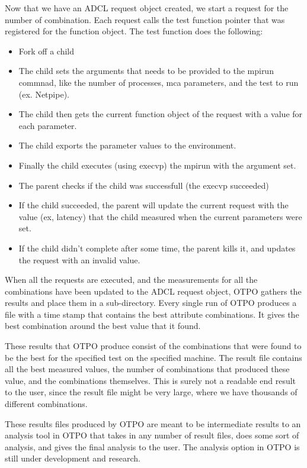Now that we have an ADCL request object created, we start a request for the
number of combination. Each request calls the test function pointer that was
registered for the function object. The test function does the following:
\begin{itemize}
\item Fork off a child
\item The child sets the arguments that needs to be provided to the mpirun
  commnad, like the number of processes, mca parameters, and the test to run
  (ex. Netpipe).
\item The child then gets the current function object of the request with a
  value for each parameter.
\item The child exports the parameter values to the environment.
\item Finally the child executes (using execvp) the mpirun with the argument
  set.
\item The parent checks if the child was successfull (the execvp succeeded)
\item If the child succeeded, the parent will update the current request with
  the value (ex, latency) that the child measured when the current parameters
  were set.
\item If the child didn't complete after some time, the parent kills it, and
  updates the request with an invalid value.
\end{itemize}

When all the requests are executed, and the measurements for all the
combinations have been updated to the ADCL request object, OTPO gathers the
results and place them in a sub-directory. Every single run of OTPO produces a
file with a time stamp that contains the best attribute combinations. It gives
the best combination around the best value that it found. 

These results that OTPO produce consist of the combinations that
were found to be the best for the specified test on the specified machine. The
result file contains all the best measured values, the number of combinations that
produced these value, and the combinations themselves. This is surely not a
readable end result to the user, since the result file might be very large,
where we have thousands of different combinations. 

These results files produced by OTPO are meant to be intermediate results to
an analysis tool in OTPO that takes in any number of result files, does some
sort of analysis, and gives the final analysis to the user. The analysis
option in OTPO is still under development and research.

